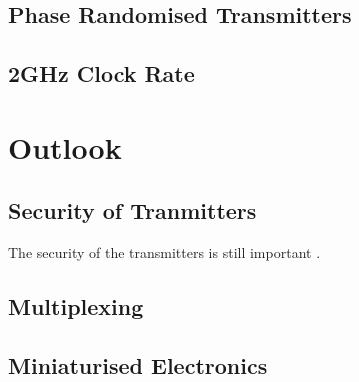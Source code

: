 \subsection{Phase Randomised Transmitters}

\subsection{2GHz Clock Rate}

\section{Outlook}

\subsection{Security of Tranmitters}

The security of the transmitters is still important \cite{makarov2019}.

\subsection{Multiplexing}

\subsection{Miniaturised Electronics}



